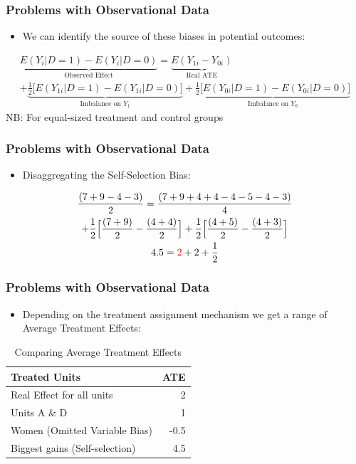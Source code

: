 \documentclass[xcolor=x11names,compress]{beamer}\usepackage[]{graphicx}\usepackage[]{color}
\renewcommand{\(}{\begin{columns}}
\renewcommand{\)}{\end{columns}}
\newcommand{\<}[1]{\begin{column}{#1}}
\renewcommand{\>}{\end{column}}
\begin{document}
\begin{frame}
\frametitle{Problems with Observational Data}
\begin{itemize}
\item We can identify the source of these biases in potential outcomes:
\end{itemize}
\begin{multline}
\underbrace{E(Y_i|D=1)-E(Y_i|D=0)}_\text{Observed Effect} = \underbrace{E(Y_{1i} - Y_{0i})}_\text{Real ATE} \\ + \underbrace{\frac{1}{2}\Big[ E(Y_{1i}|D=1) - E(Y_{1i}|D=0) \Big]}_\text{Imbalance on $Y_1$} + \underbrace{\frac{1}{2}\Big[ E(Y_{0i}|D=1) - E(Y_{0i}|D=0) \Big]}_\text{Imbalance on $Y_0$}
\end{multline}
\footnotesize
NB: For equal-sized treatment and control groups
\normalsize
\end{frame}

\begin{frame}
\frametitle{Problems with Observational Data}
\begin{itemize}
\item Disaggregating the Self-Selection Bias:
\end{itemize}
\begin{center}
\begin{multline}
\frac{(7+9-4-3)}{2} = \frac{(7+9+4+4-4-5-4-3)}{4} \\+ \frac{1}{2}\Big[ \frac{(7+9)}{2} - \frac{(4+4)}{2} \Big] + \frac{1}{2} \Big[ \frac{(4+5)}{2}- \frac{(4+3)}{2}\Big] \\
4.5 = \color{red}2 \color{black}+ 2 + \frac{1}{2}
\end{multline}
\end{center}
\end{frame}

\begin{frame}
\frametitle{Problems with Observational Data}
\begin{itemize}
\item Depending on the treatment assignment mechanism we get a range of Average Treatment Effects:
\end{itemize}
\begin{table}[htbp]
  \centering
  \caption{Comparing Average Treatment Effects}
    \begin{tabular}{|l|r|}
    \hline
    \textbf{Treated Units} & \multicolumn{1}{l|}{\textbf{ATE}} \bigstrut\\
    \hline
    Real Effect for all units & 2 \bigstrut\\
    \hline
    Units A \& D & 1 \bigstrut\\
    \hline
    Women (Omitted Variable Bias) & -0.5 \bigstrut\\
    \hline
    Biggest gains (Self-selection) & 4.5 \bigstrut\\
    \hline
    \end{tabular}%
\end{table}%
\end{frame}
\end{document}
